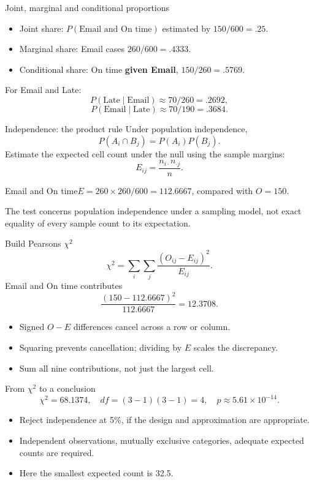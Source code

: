 \begin{frame}{Joint, marginal and conditional proportions}
\begin{itemize}\item Joint share: $P(\text{Email and On time})$ estimated by $150/600=.25$.\item Marginal share: Email cases $260/600=.4333$.\item Conditional share: On time \textbf{given Email}, $150/260=.5769$.\end{itemize}
For Email and Late:
\[
P(\text{Late}\mid\text{Email})\approx70/260=.2692,
\]
\[
P(\text{Email}\mid\text{Late})\approx70/190=.3684.
\]
\end{frame}
\begin{frame}{Independence: the product rule}
Under population independence,
\[
P(A_i\cap B_j)=P(A_i)P(B_j).
\]
Estimate the expected cell count under the null using the sample margins:
\[
E_{ij}=\frac{n_{i\cdot}n_{\cdot j}}n.
\]
\begin{block}{Email and On time}$E=260\times260/600=112.6667$, compared with $O=150$.\end{block}
The test concerns population independence under a sampling model, not exact equality of every sample count to its expectation.
\end{frame}
\begin{frame}{Build Pearson\textquotesingle s $\chi^2$}
\[
\chi^2=\sum_i\sum_j\frac{(O_{ij}-E_{ij})^2}{E_{ij}}.
\]
Email and On time contributes
\[
\frac{(150-112.6667)^2}{112.6667}=12.3708.
\]
\begin{itemize}\item Signed $O-E$ differences cancel across a row or column.\item Squaring prevents cancellation; dividing by $E$ scales the discrepancy.\item Sum all nine contributions, not just the largest cell.\end{itemize}
\end{frame}
\begin{frame}{From $\chi^2$ to a conclusion}
\[
\chi^2=68.1374,\quad df=(3-1)(3-1)=4,\quad p\approx5.61\times10^{-14}.
\]
\begin{itemize}\item Reject independence at 5\%, if the design and approximation are appropriate.\item Independent observations, mutually exclusive categories, adequate expected counts are required.\item Here the smallest expected count is 32.5.\end{itemize}
\end{frame}
